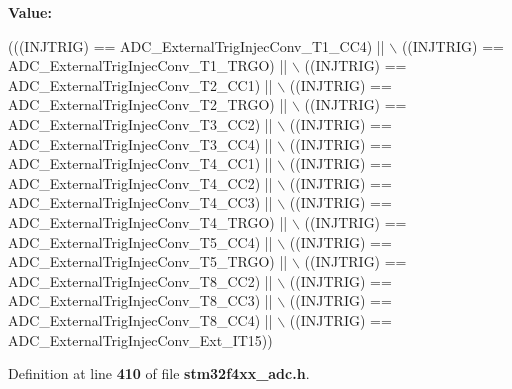 {\bfseries Value\+:}
\begin{DoxyCode}
(((INJTRIG) == ADC_ExternalTrigInjecConv_T1_CC4) || \(\backslash\)
                                        ((INJTRIG) == 
      ADC_ExternalTrigInjecConv_T1_TRGO) || \(\backslash\)
                                        ((INJTRIG) == 
      ADC_ExternalTrigInjecConv_T2_CC1) || \(\backslash\)
                                        ((INJTRIG) == 
      ADC_ExternalTrigInjecConv_T2_TRGO) || \(\backslash\)
                                        ((INJTRIG) == 
      ADC_ExternalTrigInjecConv_T3_CC2) || \(\backslash\)
                                        ((INJTRIG) == 
      ADC_ExternalTrigInjecConv_T3_CC4) || \(\backslash\)
                                        ((INJTRIG) == 
      ADC_ExternalTrigInjecConv_T4_CC1) || \(\backslash\)
                                        ((INJTRIG) == 
      ADC_ExternalTrigInjecConv_T4_CC2) || \(\backslash\)
                                        ((INJTRIG) == 
      ADC_ExternalTrigInjecConv_T4_CC3) || \(\backslash\)
                                        ((INJTRIG) == 
      ADC_ExternalTrigInjecConv_T4_TRGO) || \(\backslash\)
                                        ((INJTRIG) == 
      ADC_ExternalTrigInjecConv_T5_CC4) || \(\backslash\)
                                        ((INJTRIG) == 
      ADC_ExternalTrigInjecConv_T5_TRGO) || \(\backslash\)
                                        ((INJTRIG) == 
      ADC_ExternalTrigInjecConv_T8_CC2) || \(\backslash\)
                                        ((INJTRIG) == 
      ADC_ExternalTrigInjecConv_T8_CC3) || \(\backslash\)
                                        ((INJTRIG) == 
      ADC_ExternalTrigInjecConv_T8_CC4) || \(\backslash\)
                                        ((INJTRIG) == 
      ADC_ExternalTrigInjecConv_Ext_IT15))
\end{DoxyCode}


Definition at line \textbf{ 410} of file \textbf{ stm32f4xx\+\_\+adc.\+h}.


